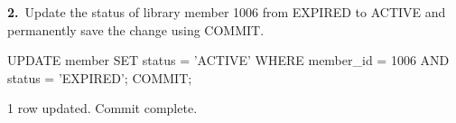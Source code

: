 \noindent\begin{minipage}{\linewidth}
\begingroup{}
{\fontsize{14}{17}\selectfont\textbf{2.}}\ Update the status of library member 1006 from EXPIRED to ACTIVE and permanently save the change using COMMIT.\par
\endgroup\vspace{12pt}


\begin{sqlcode}
UPDATE member SET status = 'ACTIVE'
WHERE member_id = 1006 AND status = 'EXPIRED';
COMMIT;
\end{sqlcode}

\vspace{18pt}


\begin{sqlout}[fontsize=\small]
1 row updated.
Commit complete.
\end{sqlout}
\end{minipage}\par\vspace{24pt}

